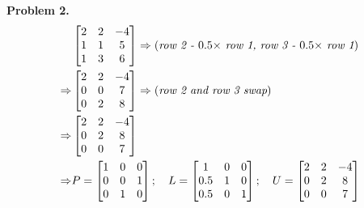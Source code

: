 \documentclass{article}
\begin{document}
\textbf{Problem 2.}
\begin{align}
    & \begin{bmatrix}
        2 & 2 & -4 \\
        1 & 1 & 5 \\
        1 & 3 & 6 
    \end{bmatrix} \nonumber 
    \Rightarrow (\emph{row 2 - $0.5\times$ row 1, row 3 - $0.5\times$ row 1}) \\ \Rightarrow
    & \begin{bmatrix}
        2 & 2 & -4 \\
        0 & 0 & 7 \\
        0 & 2 & 8 
    \end{bmatrix} \nonumber 
    \Rightarrow (\emph{row 2 and row 3 swap}) \\ \Rightarrow
    & \begin{bmatrix}
        2 & 2 & -4 \\
        0 & 2 & 8 \\
        0 & 0 & 7 
    \end{bmatrix} \nonumber \\ \Rightarrow
    & P = \begin{bmatrix}
        1 & 0 & 0 \\
        0 & 0 & 1 \\
        0 & 1 & 0
    \end{bmatrix}; \quad
    L = \begin{bmatrix}
        1 & 0 & 0 \\
        0.5 & 1 & 0 \\
        0.5 & 0 & 1
    \end{bmatrix}; \quad
    U = \begin{bmatrix}
        2 & 2 & -4 \\
        0 & 2 & 8 \\
        0 & 0 & 7
    \end{bmatrix} \nonumber
\end{align}
\bigbreak
\end{document}
